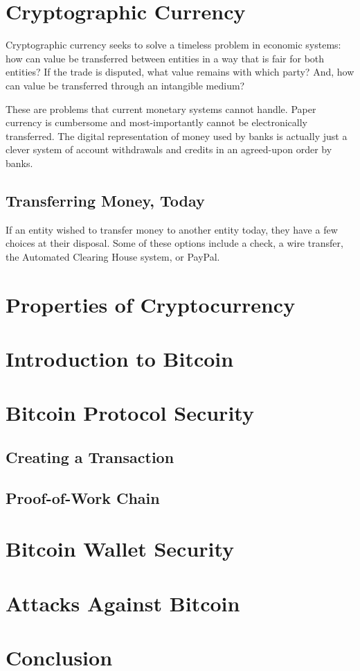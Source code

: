 \documentclass{report}
\begin{document}
\section*{Cryptographic Currency}
Cryptographic currency seeks to solve a timeless problem in economic systems:
how can value be transferred between entities in a way that is fair for both
entities? If the trade is disputed, what value remains with which party? And,
how can value be transferred through an intangible medium?

These are problems that current monetary systems cannot handle. Paper currency
is cumbersome and most-importantly cannot be electronically transferred. The
digital representation of money used by banks is actually just a clever system
of account withdrawals and credits in an agreed-upon order by banks.

\subsection*{Transferring Money, Today}
If an entity wished to transfer money to another entity today, they have a few
choices at their disposal. Some of these options include a check, a wire
transfer, the Automated Clearing House system, or
PayPal\cite{wiki:wiretransfer}.

\section*{Properties of Cryptocurrency}

\section*{Introduction to Bitcoin}

\section*{Bitcoin Protocol Security}
\subsection*{Creating a Transaction}
\subsection*{Proof-of-Work Chain}

\section*{Bitcoin Wallet Security}

\section*{Attacks Against Bitcoin}

\section*{Conclusion}

{}

\end{document}

